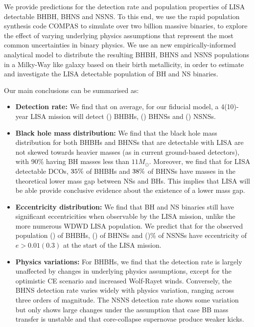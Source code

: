 We provide predictions for the detection rate and population properties of LISA detectable BHBH, BHNS and NSNS.
To this end, we use the rapid population synthesis code COMPAS to simulate over two billion massive binaries, to explore the effect of varying underlying physics assumptions that represent the most common uncertainties in binary physics. We use an new empirically-informed analytical model to distribute the resulting BHBH, BHNS and NSNS populations in a Milky-Way like galaxy based on their birth metallicity, in order to estimate and investigate the LISA detectable population of BH and NS binaries.

Our main conclusions can be summarised as:
\begin{itemize}
    \item \textbf{Detection rate:} We find that on average, for our fiducial model, a 4(10)-year LISA mission will detect \BHBHFourYear{}(\BHBHTenYear{}) BHBHs, \BHNSFourYear{}(\BHNSTenYear{}) BHNSs and \NSNSFourYear{}(\NSNSTenYear{}) NSNSs.
    \item \textbf{Black hole mass distribution:} We find that the black hole mass distribution for both BHBHs and BHNSs that are detectable with LISA are not skewed towards heavier masses (as in current ground-based detectors), with 90\% having BH masses less than $11 \unit{M_\odot}$. Moreover, we find that for LISA detectable DCOs, $35\%{}$ of BHBHs and $38\%{}$ of BHNSs have masses in the theoretical lower mass gap between NSs and BHs. This implies that LISA will be able provide conclusive evidence about the existence of a lower mass gap. 
    \item \textbf{Eccentricity distribution:} We find that BH and NS binaries still have significant eccentricities when observable by the LISA mission, unlike the more numerous WDWD LISA population. We predict that for the observed population \BHBHNotCirc{}(\BHBHHighlyEccentric{}) of BHBHs, \BHNSNotCirc{}(\BHNSHighlyEccentric{}) of BHNSs and \NSNSNotCirc{}(\NSNSHighlyEccentric{})\% of NSNSs have eccentricity of $e > 0.01(0.3)$ at the start of the LISA mission.
    \item \textbf{Physics variations:} For BHBHs, we find that the detection rate is largely unaffected by changes in underlying physics assumptions, except for the optimistic CE scenario and increased Wolf-Rayet winds. Conversely, the BHNS detection rate varies widely with physics variation, ranging across three orders of magnitude. The NSNS detection rate shows some variation but only shows large changes under the assumption that case BB mass transfer is unstable and that core-collapse supernovae produce weaker kicks.

\end{itemize}
